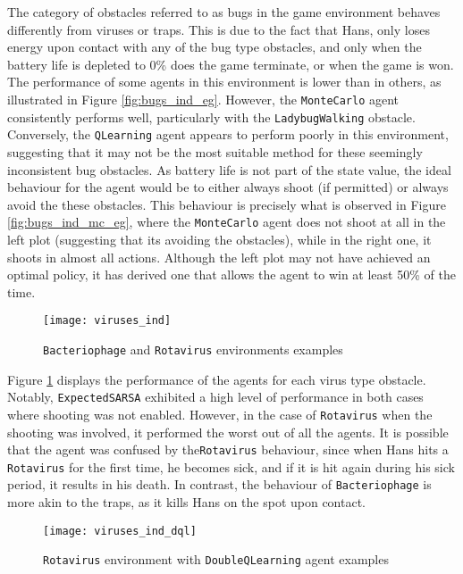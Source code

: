 The category of obstacles referred to as bugs in the game environment behaves differently from viruses or traps. This is due to the fact that Hans, only loses energy upon contact with any of the bug type obstacles, and only when the battery life is depleted to 0\% does the game terminate, or when the game is won. The performance of some agents in this environment is lower than in others, as illustrated in Figure \ref{fig:bugs_ind_eg}. However, the \texttt{MonteCarlo} agent consistently performs well, particularly with the \texttt{LadybugWalking} obstacle. Conversely, the \texttt{QLearning} agent appears to perform poorly in this environment, suggesting that it may not be the most suitable method for these seemingly inconsistent bug obstacles. As battery life is not part of the state value, the ideal behaviour for the agent would be to either always shoot (if permitted) or always avoid the these obstacles. This behaviour is precisely what is observed in Figure \ref{fig:bugs_ind_mc_eg}, where the \texttt{MonteCarlo} agent does not shoot at all in the left plot (suggesting that its avoiding the obstacles), while in the right one, it shoots in almost all actions. Although the left plot may not have achieved an optimal policy, it has derived one that allows the agent to win at least 50\% of the time.

\begin{figure}[h]
    \centering
    \texttt{[image: viruses\_ind]}
    \caption{\texttt{Bacteriophage} and \texttt{Rotavirus} environments examples}
    \label{fig:viruses_ind_eg}
\end{figure}

Figure \ref{fig:viruses_ind_eg} displays the performance of the agents for each virus type obstacle. Notably, \texttt{ExpectedSARSA} exhibited a high level of performance in both cases where shooting was not enabled. However, in the case of \texttt{Rotavirus} when the shooting was involved, it performed the worst out of all the agents. It is possible that the agent was confused by the\texttt{Rotavirus} behaviour, since when Hans hits a \texttt{Rotavirus} for the first time, he becomes sick, and if it is hit again during his sick period, it results in his death. In contrast, the behaviour of \texttt{Bacteriophage} is more akin to the traps, as it kills Hans on the spot upon contact.

\begin{figure}[h]
    \centering
    \texttt{[image: viruses\_ind\_dql]}
    \caption{\texttt{Rotavirus} environment with \texttt{DoubleQLearning} agent examples}
    \label{fig:viruses_ind_dql_eg}
\end{figure}

